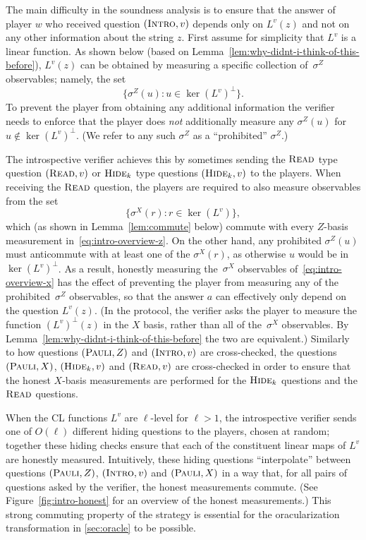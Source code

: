 \documentclass[11pt]{article}
\theoremstyle{definition}
\newcommand{\trole}{\ensuremath{v}}
\newcommand{\typestyle}[1]{\ensuremath{\textsc{#1}}\xspace}
\newcommand{\Pauli}{\typestyle{Pauli}}
\newcommand{\Read}{\typestyle{Read}}
\newcommand{\Hide}[1]{\typestyle{Hide}_{#1}}
\newcommand{\Introspect}{\typestyle{Intro}}
\begin{document}
The main difficulty in the soundness analysis is to ensure that the answer of
player $w$ who received question $(\Introspect, \trole)$ depends only on
$L^\trole(z)$ and not on any other information about the string $z$.
First assume for simplicity that $L^\trole$ is a linear function.
As shown below (based on Lemma~\ref{lem:why-didnt-i-think-of-this-before}),
$L^\trole(z)$ can be obtained by measuring a specific collection of~$\sigma^Z$
observables; namely, the set
\begin{equation}
  \label{eq:intro-overview-z}
  \{\sigma^Z(u) : u \in \ker(L^\trole)^\perp\}.
\end{equation}
To prevent the player from obtaining any additional information the verifier
needs to enforce that the player does \emph{not} additionally measure any
$\sigma^Z(u)$ for $u \notin \ker(L^\trole)^\perp$.
(We refer to any such $\sigma^Z$ as a ``prohibited'' $\sigma^Z$.)

The introspective verifier achieves this by sometimes sending the $\Read$ type
question $(\Read, \trole)$ or $\Hide{k}$ type questions $(\Hide{k}, \trole)$ to the
players.
When receiving the $\Read$ question, the players are required to also measure
observables from the set
\begin{equation}
  \label{eq:intro-overview-x}
  \{\sigma^X(r) : r \in \ker(L^\trole)\},
\end{equation}
which (as shown in Lemma~\ref{lem:commute} below) commute with every $Z$-basis
measurement in~\eqref{eq:intro-overview-z}.
On the other hand, any prohibited $\sigma^Z(u)$ must anticommute with at least
one of the $\sigma^X(r)$, as otherwise $u$ would be in $\ker(L^\trole)^\perp$.
As a result, honestly measuring the~$\sigma^X$ observables
of~\eqref{eq:intro-overview-x} has the effect of preventing the player from
measuring any of the prohibited~$\sigma^Z$ observables, so that the answer $a$
can effectively only depend on the question $L^\trole(z)$.
(In the protocol, the verifier asks the player to measure the function
$(L^\trole)^\perp(z)$ in the $X$ basis, rather than all of the~$\sigma^X$
observables.
By Lemma~\ref{lem:why-didnt-i-think-of-this-before} the two are equivalent.)
Similarly to how questions $(\Pauli, Z)$ and $(\Introspect, \trole)$ are
cross-checked, the questions $(\Pauli, X)$, $(\Hide{k}, \trole)$ and $(\Read,
\trole)$ are cross-checked in order to ensure that the honest $X$-basis
measurements are performed for the $\Hide{k}$ questions and the $\Read$ questions.

When the CL functions $L^\trole$ are $\ell$-level for $\ell > 1$, the
introspective verifier sends one of $O(\ell)$ different hiding questions to the
players, chosen at random; together these hiding checks ensure that each of the
constituent linear maps of $L^\trole$ are honestly measured.
Intuitively, these hiding questions ``interpolate'' between questions
$(\Pauli,Z)$, $(\Introspect,\trole)$ and $(\Pauli,X)$ in a way that, for all
pairs of questions asked by the verifier, the honest measurements commute.
(See Figure~\ref{fig:intro-honest} for an overview of the honest measurements.)
This strong commuting property of the strategy is essential for the
oracularization transformation in \cref{sec:oracle} to be possible.
\end{document}
